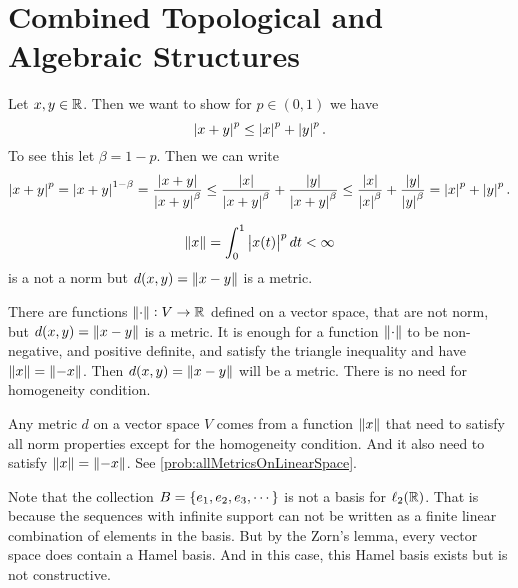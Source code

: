\chapter{Combined Topological and Algebraic Structures}


\begin{summary}
	Let $ x,y\in \mathbb{R} $. Then we want to show for $ p\in (0,1) $ we have
	\[ \left|x+y\right|^p \leq \left|x\right|^p + \left|y\right|^p. \]
	To see this let $ \beta = 1-p $. Then we can write
	\[ \left|x+y\right|^p = \left|x+y\right|^{1-\beta} = \frac{\left|x+y\right|}{\left|x+y\right|^\beta} \leq \frac{\left|x\right|}{\left|x+y\right|^\beta} + \frac{\left|y\right|}{\left|x+y\right|^\beta} \leq \frac{\left|x\right|}{\left|x\right|^\beta} + \frac{\left|y\right|}{\left|y\right|^\beta} = \left|x\right|^p + \left|y\right|^p. \]
\end{summary}

\begin{summary}
	\[ \norm{x} = \int_{0}^{1} \left|x(t)\right|^p dt < \infty \]
	is a not a norm but $ d(x,y) = \norm{x-y} $ is a metric.
\end{summary}

\begin{summary}
	There are functions $ \norm{\cdot}:V \to\mathbb{R} $ defined on a vector space, that are not norm, but $ d(x,y) = \norm{x-y} $ is a metric. It is enough for a function $ \norm{\cdot} $ to be non-negative, and positive definite, and satisfy the triangle inequality and have $ \norm{x}=\norm{-x} $. Then $ d(x,y) =\norm{x-y} $ will be a metric. There is no need for homogeneity condition.
\end{summary}

\begin{summary}
	Any metric $ d $ on a vector space $ V $ comes from a function $ \norm{x} $ that need to satisfy all norm properties except for the homogeneity condition. And it also need to satisfy $ \norm{x} = \norm{-x} $. See \autoref{prob:allMetricsOnLinearSpace}.
\end{summary}


\begin{summary}
	Note that the collection $ B = \{e_1,e_2,e_3,\cdots\} $ is not a basis for $ \ell_2(\mathbb{R}) $. That is because the sequences with infinite support can not be written as a finite linear combination of elements in the basis. But by the Zorn's lemma, every vector space does contain a Hamel basis. And in this case, this Hamel basis exists but is not constructive.
\end{summary}


